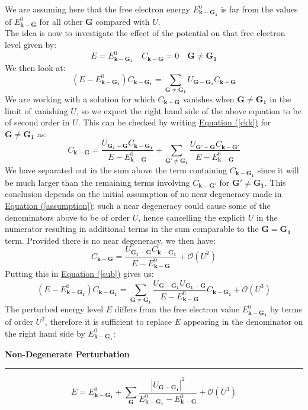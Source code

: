\documentclass[10.75pt,a4paper,openright,bottom=2cm]{article}
\renewcommand{\Vec}[1]{\boldsymbol{#1}}
\renewcommand{\refeq}[1]{\hyperref[#1]{Equation (\ref{#1})}}
\begin{document}
We are assuming here that the free electron energy $E^0_{\Vec{k}-\Vec{G_1}}$ is far from the values of $E^0_{\Vec{k}-\Vec{G}}$ for all other $\Vec{G}$ compared with $U$.\\
The idea is now to investigate the effect of the potential on that free electron level given by:
\[
E=E^0_{\Vec{k}-\Vec{G_1}} \quad C_{\Vec{k}-\Vec{G}}=0 \quad \Vec{G}\neq\Vec{G_1}
\]
We then look at:
\begin{equation}
\label{sub}
(E-E^0_{\Vec{k}-\Vec{G_1}})C_{\Vec{k}-\Vec{G_1}}=\sum_{\Vec{G}\neq\Vec{G_1}}U_{\Vec{G}-\Vec{G_1}}C_{\Vec{k}-\Vec{G}}
\end{equation}
We are working with a solution for which $C_{\Vec{k}-\Vec{G}}$ vanishes when $\Vec{G}\neq\Vec{G_1}$ in the limit of vanishing $U$, so we expect the right hand side of the above equation to be of second order in $U$. This can be checked by writing \hyperref[ckk]{Equation (\ref{ckk})} for $\Vec{G}\neq\Vec{G_1}$ as:
\[
C_{\Vec{k}-\Vec{G}}=\frac{U_{\Vec{G_1}-\Vec{G}}C_{\Vec{k}-\Vec{G_1}}}{E-E^0_{\Vec{k}-\Vec{G}}}+\sum_{\Vec{G'}\neq\Vec{G_1}}\frac{U_{\Vec{G'}-\Vec{G}}C_{\Vec{k}-\Vec{G'}}}{E-E^0_{\Vec{k}-\Vec{G}}}
\]
We have separated out in the sum above the term containing $C_{\Vec{k}-\Vec{G_1}}$ since it will be much larger than the remaining terms involving $C_{\Vec{k}-\Vec{G'}}$ for $\Vec{G'}\neq\Vec{G_1}$. This conclusion depends on the initial assumption of no near degeneracy made in \refeq{assumption}: such a near degeneracy could cause some of the denominators above to be of order $U$, hence cancelling the explicit $U$ in the numerator resulting in additional terms in the sum comparable to the $\Vec{G}=\Vec{G_1}$ term. Provided there is no near degeneracy, we then have:
\[
C_{\Vec{k}-\Vec{G}}=\frac{U_{\Vec{G_1}-\Vec{G}}C_{\Vec{k}-\Vec{G_1}}}{E-E^0_{\Vec{k}-\Vec{G}}}+\mathcal{O}(U^2)
\]
Putting this in \refeq{sub} gives us:
\begin{equation}
\label{nodeg}
(E-E^0_{\Vec{k}-\Vec{G_1}})C_{\Vec{k}-\Vec{G_1}}=\sum_{\Vec{G}\neq\Vec{G_1}}\frac{U_{\Vec{G}-\Vec{G_1}}U_{\Vec{G_1}-\Vec{G}}}{E-E^0_{\Vec{k}-\Vec{G}}}C_{\Vec{k}-\Vec{G_1}}+\mathcal{O}(U^3)
\end{equation}
The perturbed energy level $E$ differs from the free electron value $E^0_{\Vec{k}-\Vec{G_1}}$ by terms of order $U^2$, therefore it is sufficient to replace $E$ appearing in the denominator on the right hand side by $E^0_{\Vec{k}-\Vec{G_1}}$:
\begin{mybox}
\textbf{Non-Degenerate Perturbation}
\hrule
\vspace{0.2cm}
\[
E=E^0_{\Vec{k}-\Vec{G_1}}+\sum_{\Vec{G}}\frac{|U_{\Vec{G}-\Vec{G_1}}|^2}{E^0_{\Vec{k}-\Vec{G_1}}-E^0_{\Vec{k}-\Vec{G}}}+\mathcal{O}(U^3)
\]
\end{mybox}\noindent
\end{document}
